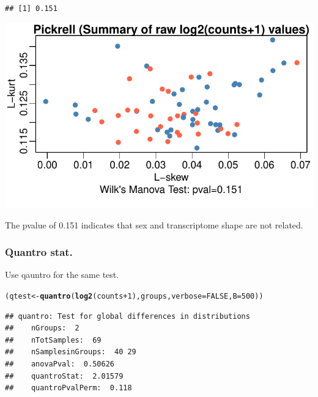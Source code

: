 \documentclass{article}\usepackage[]{graphicx}\usepackage[usenames,dvipsnames]{color}
\makeatletter
\def\maxwidth{ %
  \ifdim\Gin@nat@width>\linewidth
    \linewidth
  \else
    \Gin@nat@width
  \fi
}
\newcommand{\hlnum}[1]{\textcolor[rgb]{0.686,0.059,0.569}{#1}}%
\newcommand{\hlopt}[1]{\textcolor[rgb]{0,0,0}{#1}}%
\newcommand{\hlstd}[1]{\textcolor[rgb]{0.345,0.345,0.345}{#1}}%
\newcommand{\hlkwb}[1]{\textcolor[rgb]{0.69,0.353,0.396}{#1}}%
\newcommand{\hlkwc}[1]{\textcolor[rgb]{0.333,0.667,0.333}{#1}}%
\newcommand{\hlkwd}[1]{\textcolor[rgb]{0.737,0.353,0.396}{\textbf{#1}}}%
\newenvironment{kframe}{%
 \def\at@end@of@kframe{}%
 \ifinner\ifhmode%
  \def\at@end@of@kframe{\end{minipage}}%
  \begin{minipage}{\columnwidth}%
 \fi\fi%
 \def\FrameCommand##1{\hskip\@totalleftmargin \hskip-\fboxsep
 \colorbox{shadecolor}{##1}\hskip-\fboxsep
     \hskip-\linewidth \hskip-\@totalleftmargin \hskip\columnwidth}%
 \MakeFramed {\advance\hsize-\width
   \@totalleftmargin\z@ \linewidth\hsize
   \@setminipage}}%
 {\par\unskip\endMakeFramed%
 \at@end@of@kframe}
\newenvironment{knitrout}{}{} %
\makeatother
\begin{document}
\begin{knitrout}
\color{fgcolor}\begin{kframe}
\begin{verbatim}
## [1] 0.151
\end{verbatim}
\end{kframe}

{\centering \includegraphics[width=\maxwidth]{figure/lrats-1} 

}



\end{knitrout}

The pvalue of 0.151 indicates that sex and transcriptome shape are not
related.

\subsubsection{Quantro stat.}

Use qauntro for the same test. 

\begin{knitrout}
\color{fgcolor}\begin{kframe}
\begin{alltt}
\hlstd{(qtest} \hlkwb{<-} \hlkwd{quantro}\hlstd{(}\hlkwd{log2}\hlstd{(counts}\hlopt{+}\hlnum{1}\hlstd{), groups,} \hlkwc{verbose}\hlstd{=}\hlnum{FALSE}\hlstd{,} \hlkwc{B}\hlstd{=}\hlnum{500}\hlstd{))}
\end{alltt}
\begin{verbatim}
## quantro: Test for global differences in distributions
##    nGroups:  2 
##    nTotSamples:  69 
##    nSamplesinGroups:  40 29 
##    anovaPval:  0.50626 
##    quantroStat:  2.01579 
##    quantroPvalPerm:  0.118
\end{verbatim}
\end{kframe}
\end{knitrout}
\end{document}
